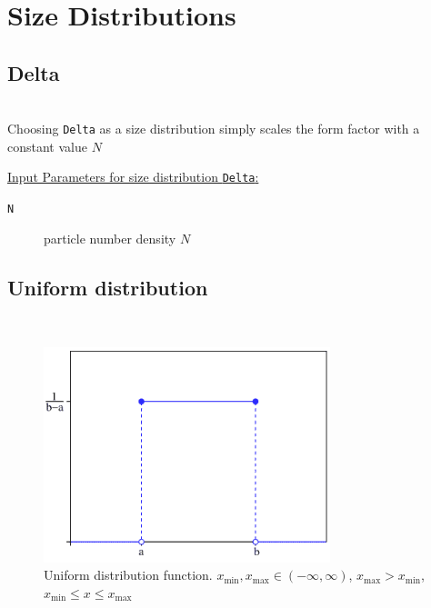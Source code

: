 \chapter{Size Distributions}
\label{sizedistribution}

\section{Delta} \hspace{1pt} \\
\label{sec:Delta}
Choosing \texttt{Delta} as a size distribution simply scales the form factor with a constant value $N$

\vspace{5mm}
\underline{Input Parameters for size distribution \texttt{Delta}:}
\begin{description}
\item[\texttt{N}] particle number density $N$
\end{description}

\clearpage

\section{Uniform distribution} \hspace{1pt} \\

\begin{figure}[htb]
\begin{center}
\includegraphics[width=0.744\textwidth,height=0.558\textwidth]{Uniform.png}
\end{center}
\caption{Uniform distribution function. $x_\text{min},x_\text{max} \in
(-\infty,\infty)$, $x_\text{max}>x_\text{min}$, $x_\text{min}\leq x \leq x_\text{max}$} \label{Uniform}
\end{figure}

